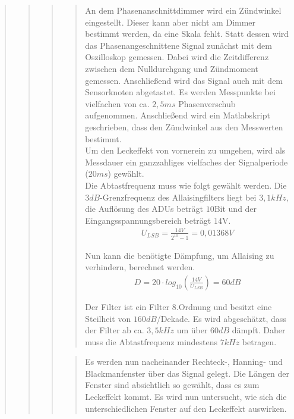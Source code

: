 \begin{quote}
\begin{quote}
\begin{quote}
			\begin{quote}
			An dem Phasenanschnittdimmer wird ein Zündwinkel eingestellt. Dieser kann aber nicht am Dimmer 
			bestimmt werden, da eine Skala fehlt. Statt dessen wird das Phasenangeschnittene Signal zunächst 
			mit dem Oszilloskop gemessen. Dabei wird die Zeitdifferenz zwischen dem
			Nulldurchgang und Zündmoment gemessen. Anschließend wird das Signal auch mit dem Sensorknoten abgetastet.
			Es werden Messpunkte bei vielfachen von ca. $2,5ms$ Phasenverschub
			aufgenommen.
			Anschließend wird ein Matlabskript geschrieben, dass den Zündwinkel aus den Messwerten bestimmt.\\ 
			Um den Leckeffekt von vornerein zu umgehen, wird als Messdauer ein ganzzahliges vielfaches der 
			Signalperiode ($20ms$) gewählt.\\ 
			Die Abtastfrequenz muss wie folgt gewählt werden. Die $3dB$-Grenzfrequenz des
			Allaisingfilters liegt bei $3,1kHz$, die Auflösung des ADUs beträgt $10$Bit
			und der Eingangsspannungsbereich beträgt $14$V.\\
			
			\begin{align}
			U_{LSB} = \frac{14V}{2^{10}-1} = 0,01368V 
			\end{align} 
			
			Nun kann die benötigte Dämpfung, um Allaising zu verhindern, berechnet werden.\\
			
			\begin{align}
			D = 20 \cdot log_{10}(\frac{14V}{U_{LSB}}) = 60dB
			\end{align} 
			
			Der Filter ist ein Filter $8$.Ordnung und besitzt eine Steilheit von
			$160dB$/Dekade. Es wird abgeschätzt, dass der Filter ab ca. $3,5kHz$ um über
			$60dB$ dämpft. Daher muss die Abtastfrequenz mindestens $7kHz$ betragen.
			\end{quote}
			
			\begin{quote}
			Es werden nun nacheinander Rechteck-, Hanning- und Blackmanfenster über das Signal gelegt. 
			Die Längen der Fenster sind absichtlich so gewählt, dass es zum Leckeffekt kommt. 
			Es wird nun untersucht, wie sich die unterschiedlichen Fenster auf den Leckeffekt auswirken. 
			\end{quote}
			

\end{quote}
\end{quote}
\end{quote}
